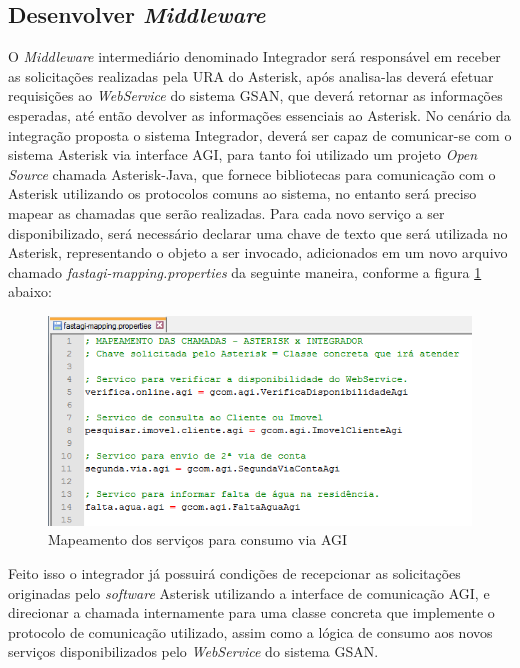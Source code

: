 \subsection{Desenvolver \textit{Middleware}}

O \textit{Middleware} intermediário denominado Integrador será responsável em receber as solicitações realizadas pela URA do Asterisk, após analisa-las deverá efetuar requisições ao \textit{WebService} do sistema GSAN, que deverá retornar as informações esperadas, até então devolver as informações essenciais ao Asterisk.
No cenário da integração proposta o sistema Integrador, deverá ser capaz de comunicar-se com o sistema Asterisk via interface AGI, para tanto foi utilizado um projeto \textit{Open Source} chamada Asterisk-Java, que fornece bibliotecas para comunicação com o Asterisk utilizando os protocolos comuns ao sistema, no entanto será preciso mapear as chamadas que serão realizadas.
Para cada novo serviço a ser disponibilizado, será necessário declarar uma chave de texto que será utilizada no Asterisk, representando o objeto a ser invocado, adicionados em um novo arquivo chamado \textit{fastagi-mapping.properties} da seguinte maneira, conforme a figura \ref{figura:mapeamenteServicosAGI} abaixo:

\begin{figure}[H]
	\centering
	\caption{Mapeamento dos serviços para consumo via AGI}
	\label{figura:mapeamenteServicosAGI}
	\includegraphics{figuras/mapeamento_servicos_agi.png}
\end{figure}


Feito isso o integrador já possuirá condições de recepcionar as solicitações originadas pelo \textit{software} Asterisk utilizando a interface de comunicação AGI, e direcionar a chamada internamente para uma classe concreta que implemente o protocolo de comunicação utilizado, assim como a lógica de consumo aos novos serviços disponibilizados pelo \textit{WebService} do sistema GSAN.


